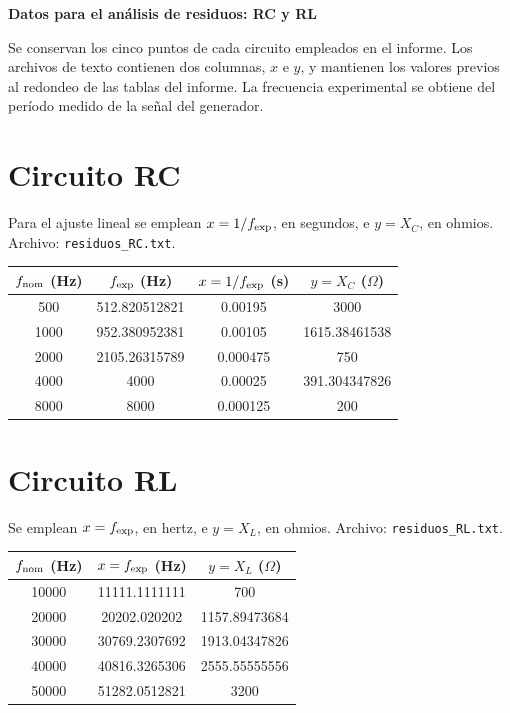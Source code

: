 \documentclass[10pt,letterpaper]{article}
\begin{document}
\begin{center}
{\Large\bfseries Datos para el análisis de residuos: RC y RL}
\end{center}
Se conservan los cinco puntos de cada circuito empleados en el informe.
Los archivos de texto contienen dos columnas, $x$ e $y$, y mantienen los valores
previos al redondeo de las tablas del informe. La frecuencia experimental se obtiene
del período medido de la señal del generador.

\section*{Circuito RC}
Para el ajuste lineal se emplean $x=1/f_{\rm exp}$, en segundos,
e $y=X_C$, en ohmios. Archivo: \texttt{residuos\_RC.txt}.
\begin{center}
\small
\begin{tabular}{cccc}
\toprule
$f_{\rm nom}$ (Hz) & $f_{\rm exp}$ (Hz) & $x=1/f_{\rm exp}$ (s) & $y=X_C$ ($\Omega$) \\
\midrule
\num{500} & \num{512.820512821} & \num{0.00195} & \num{3000} \\
\num{1000} & \num{952.380952381} & \num{0.00105} & \num{1615.38461538} \\
\num{2000} & \num{2105.26315789} & \num{0.000475} & \num{750} \\
\num{4000} & \num{4000} & \num{0.00025} & \num{391.304347826} \\
\num{8000} & \num{8000} & \num{0.000125} & \num{200} \\
\bottomrule
\end{tabular}
\end{center}

\section*{Circuito RL}
Se emplean $x=f_{\rm exp}$, en hertz, e $y=X_L$, en ohmios.
Archivo: \texttt{residuos\_RL.txt}.
\begin{center}
\small
\begin{tabular}{ccc}
\toprule
$f_{\rm nom}$ (Hz) & $x=f_{\rm exp}$ (Hz) & $y=X_L$ ($\Omega$) \\
\midrule
\num{10000} & \num{11111.1111111} & \num{700} \\
\num{20000} & \num{20202.020202} & \num{1157.89473684} \\
\num{30000} & \num{30769.2307692} & \num{1913.04347826} \\
\num{40000} & \num{40816.3265306} & \num{2555.55555556} \\
\num{50000} & \num{51282.0512821} & \num{3200} \\
\bottomrule
\end{tabular}
\end{center}
\end{document}
